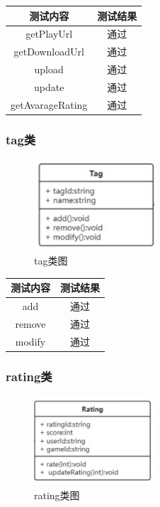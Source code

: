 \documentclass[12pt]{ctexart} %
\begin{document}
  \begin{table}[H]
  \centering  %
  \begin{tabular}{|c|c|}
    \hline
    测试内容 & 测试结果 \\
    \hline
    getPlayUrl& 通过 \\
    \hline
    getDownloadUrl& 通过 \\
    \hline
    upload& 通过 \\
    \hline
    update& 通过 \\
    \hline
    getAvarageRating& 通过 \\
    \hline
  \end{tabular}
\end{table}

\subsubsection{tag类}
  \begin{figure}[H] %
      \centering %
      \includegraphics[width=0.4\textwidth]{./images/tag.png} %
      \caption{tag类图} %
  \end{figure}

  \begin{table}[H]
  \centering  %
  \begin{tabular}{|c|c|}
    \hline
    测试内容 & 测试结果 \\
    \hline
    add& 通过 \\
    \hline
    remove& 通过 \\
    \hline
    modify& 通过 \\
    \hline
  \end{tabular}
\end{table}

\subsubsection{rating类}
  \begin{figure}[H] %
      \centering %
      \includegraphics[width=0.4\textwidth]{./images/rating.png} %
      \caption{rating类图} %
  \end{figure}
\end{document}
